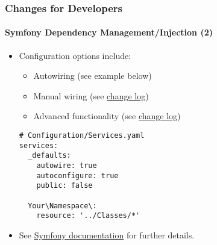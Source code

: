 \begin{frame}[fragile]
	\frametitle{Changes for Developers}
	\framesubtitle{Symfony Dependency Management/Injection (2)}

	\lstset{basicstyle=\tiny\ttfamily}

	\begin{itemize}
		\item Configuration options include:

			\begin{itemize}
				\item Autowiring (see example below)
				\item Manual wiring
					(see \href{https://docs.typo3.org/c/typo3/cms-core/master/en-us/Changelog/10.0/Feature-84112-SymfonyDependencyInjectionForCoreAndExtbase.html}{change log})
				\item Advanced functionality
					(see \href{https://docs.typo3.org/c/typo3/cms-core/master/en-us/Changelog/10.0/Feature-84112-SymfonyDependencyInjectionForCoreAndExtbase.html}{change log})
			\end{itemize}


\begin{lstlisting}
# Configuration/Services.yaml
services:
  _defaults:
    autowire: true
    autoconfigure: true
    public: false

  Your\Namespace\:
    resource: '../Classes/*'
\end{lstlisting}

		\item See \href{https://symfony.com/doc/current/service_container.html}{Symfony documentation} for further details.

	\end{itemize}

\end{frame}



